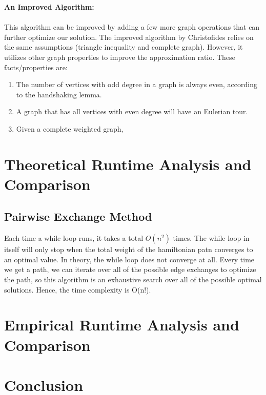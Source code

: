 \documentclass[11pt]{article}
\begin{document}
  \textbf{An Improved Algorithm:}  \paragraph{}
  
  This algorithm can be improved by adding a few more graph operations that can further optimize our solution.
  The improved algorithm by Christofides relies on the same assumptions (triangle inequality and complete graph). 
  However, it utilizes other graph properties to improve the approximation ratio. These facts/properties are:
  \begin{enumerate}
    \item The number of vertices with odd degree in a graph is always even, according to the handshaking lemma. 
    \item A graph that has all vertices with even degree will have an Eulerian tour. 
    \item Given a complete weighted graph, 
  \end{enumerate}  
  
  
\section{Theoretical Runtime Analysis and Comparison}
\subsection{Pairwise Exchange Method}
Each time a while loop runs, it takes a total $O(n^2)$ times. The while loop in itself will only stop when the total weight of the hamiltonian patn converges to an optimal value. In theory, the while loop does not converge at all. Every time we get a path, we can iterate over all of the possible edge exchanges to optimize the path, so this algorithm is an exhaustive search over all of the possible optimal solutions. Hence, the time complexity is O(n!).
\section{Empirical Runtime Analysis and Comparison}
\section{Conclusion}
\newpage
\end{document}
